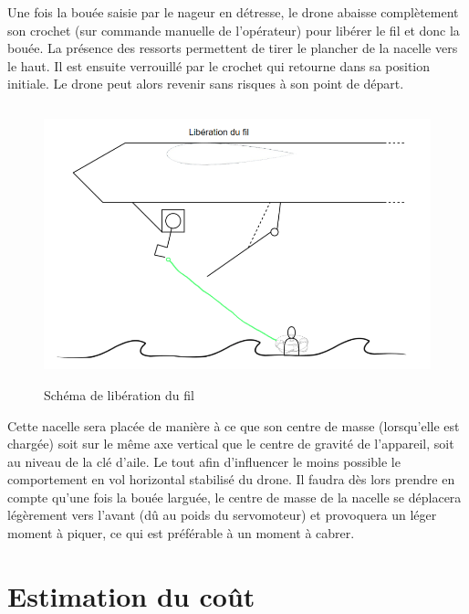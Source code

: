 \documentclass[a4paper,12pt,french]{report}
\begin{document}
Une fois la bouée saisie par le nageur en détresse, le drone abaisse complètement son crochet (sur commande manuelle de l’opérateur) pour libérer le fil et donc la bouée. La présence des ressorts permettent de tirer le plancher de la nacelle vers le haut. Il est ensuite verrouillé par le crochet qui retourne dans sa position initiale. Le drone peut alors revenir sans risques à son point de départ.\newline

\begin{figure}[h]
    \centering
    \includegraphics[height=8cm]{figures/b4.png}
    \caption{Schéma de libération du fil}
\end{figure}

Cette nacelle sera placée de manière à ce que son centre de masse (lorsqu’elle est chargée) soit sur le même axe vertical que le centre de gravité de l’appareil, soit au niveau de la clé d’aile. Le tout afin d’influencer le moins possible le comportement en vol horizontal stabilisé du drone. Il faudra dès lors prendre en compte qu’une fois la bouée larguée, le centre de masse de la nacelle se déplacera légèrement vers l’avant (dû au poids du servomoteur) et provoquera un léger moment à piquer, ce qui est préférable à un moment à cabrer.

\chapter{Estimation du coût}
\end{document}
